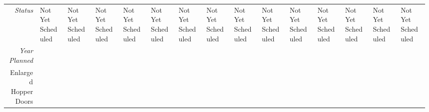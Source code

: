 \begin{tabularx}{\textwidth}{r|X|X|X|X|X|X|X|X|X|X|X|X|X|X|}
    \multicolumn{1}{|r|}{\cellcolor{ccorangelight}\textit{Status}}                & Not Yet Scheduled                                                         & Not Yet Scheduled                                                         & Not Yet Scheduled                                                         & Not Yet Scheduled                                                         & Not Yet Scheduled                                                         & Not Yet Scheduled                                                         & Not Yet Scheduled                                                         & Not Yet Scheduled                                                         & Not Yet Scheduled                                                         & Not Yet Scheduled                                                         & Not Yet Scheduled                                                         & Not Yet Scheduled                                                         & Not Yet Scheduled                                                         & Not Yet Scheduled                                                         \\
    \multicolumn{1}{|r|}{\cellcolor{ccorangelight}\textit{Year Planned}}                  &                                                      &                                                      &                                                      &                                                      &                                                      &                                                      &                                                      &                                                      &                                                      &                                                      &                                                      &                                                      &                                                      &                                                      \\ \hline
\multicolumn{1}{|V{.2\columnwidth}|}{\cellcolor{ccorangelight}Enlarged Hopper Doors}          &                                                                  &                                                                  &                                                                  &                                                                  &                                                                  &                                                                  &                                                                  &                                                                  &                                                                  &                                                                  &                                                                  &                                                                  &                                                                  &                                                                  \\

\end{tabularx}
